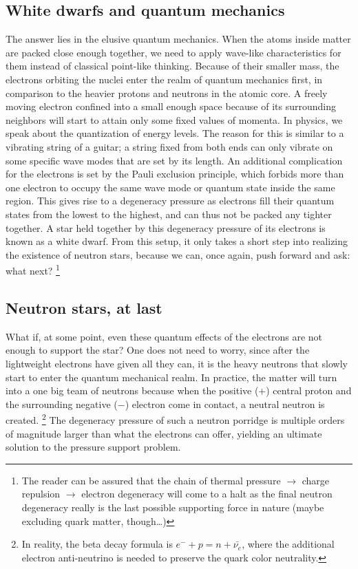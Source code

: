 \subsection{White dwarfs and quantum mechanics}
The answer lies in the elusive quantum mechanics.
When the atoms inside matter are packed close enough together, we need to apply wave-like characteristics for them instead of classical point-like thinking.
Because of their smaller mass, the electrons orbiting the nuclei enter the realm of quantum mechanics first, in comparison to the heavier protons and neutrons in the atomic core.
A freely moving electron confined into a small enough space because of its surrounding neighbors will start to attain only some fixed values of momenta.
In physics, we speak about the quantization of energy levels.
The reason for this is similar to a vibrating string of a guitar; a string fixed from both ends can only vibrate on some specific wave modes that are set by its length.
An additional complication for the electrons is set by the Pauli exclusion principle, which forbids more than one electron to occupy the same wave mode or quantum state inside the same region.
This gives rise to a degeneracy pressure as electrons fill their quantum states from the lowest to the highest, and can thus not be packed any tighter together.
A star held together by this degeneracy pressure of its electrons is known as a white dwarf.
From this setup, it only takes a short step into realizing the existence of neutron stars, because we can, once again, push forward and ask: what next?%
\footnote{The reader can be assured that the chain of thermal pressure $\rightarrow$ charge repulsion $\rightarrow$ electron degeneracy will come to a halt as the final neutron degeneracy really is the last possible supporting force in nature (maybe excluding quark matter, though\ldots)}


\subsection{Neutron stars, at last}
What if, at some point, even these quantum effects of the electrons are not enough to support the star?
One does not need to worry, since after the lightweight electrons have given all they can, it is the heavy neutrons that slowly start to enter the quantum mechanical realm.
In practice, the matter will turn into a one big team of neutrons because when the positive ($+$) central proton and the surrounding negative ($-$) electron come in contact, a neutral neutron is created.%
\footnote{In reality, the beta decay formula is $e^- + p = n + \bar{\nu_e}$, where the additional electron anti-neutrino is needed to preserve the quark color neutrality.}
The degeneracy pressure of such a neutron porridge is multiple orders of magnitude larger than what the electrons can offer, yielding an ultimate solution to the pressure support problem.

